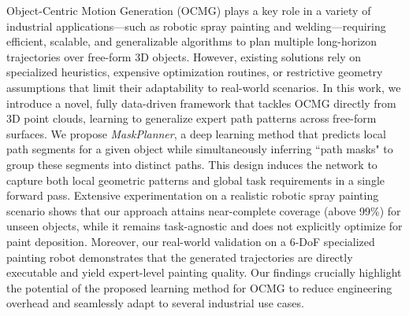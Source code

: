Object-Centric Motion Generation (OCMG) plays a key role in a variety of industrial applications---such as robotic spray painting and welding---requiring efficient, scalable, and generalizable algorithms to plan multiple long-horizon trajectories over free-form 3D objects.
However, existing solutions rely on specialized heuristics, expensive optimization routines, or restrictive geometry assumptions that limit their adaptability to real-world scenarios.
In this work, we introduce a novel, fully data-driven framework that tackles OCMG directly from 3D point clouds, learning to generalize expert path patterns across free-form surfaces.
We propose \emph{MaskPlanner}, a deep learning method that predicts local path segments for a given object while simultaneously inferring ``path masks" to group these segments into distinct paths.
This design induces the network to capture both local geometric patterns and global task requirements in a single forward pass.
%
Extensive experimentation on a realistic robotic spray painting scenario shows that our approach attains near-complete coverage (above 99\%) for unseen objects, while it remains task-agnostic and does not explicitly optimize for paint deposition.
%
Moreover, our real-world validation on a 6-DoF specialized painting robot demonstrates that the generated trajectories are directly executable and yield expert-level painting quality.
%
Our findings crucially highlight the potential of the proposed learning method for OCMG to reduce engineering overhead and seamlessly adapt to several industrial use cases.